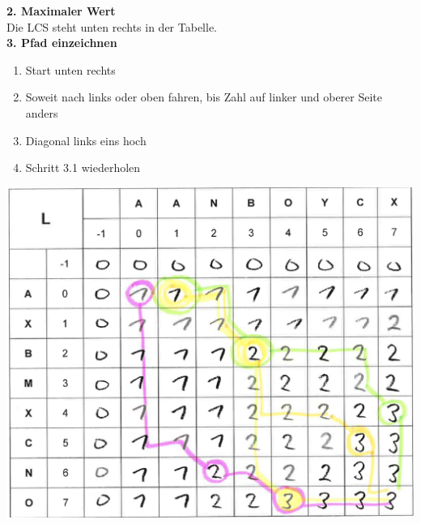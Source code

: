 \textbf{2. Maximaler Wert}\\
Die LCS steht unten rechts in der Tabelle.\\

\textbf{3. Pfad einzeichnen}\\
\begin{enumerate}
    \item Start unten rechts
    \item Soweit nach links oder oben fahren, bis Zahl auf linker und oberer Seite anders
    \item Diagonal links eins hoch
    \item Schritt 3.1 wiederholen
\end{enumerate}
\begin{center}
    \includegraphics[scale=0.2]{graphic/10 DynamicProgramming/lcs.png}
\end{center}


\newpage